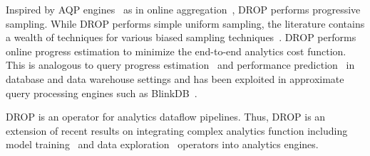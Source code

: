 Inspired by AQP engines~\cite{barzan-keynote}
as in online aggregation~\cite{onlineagg}, DROP performs progressive
sampling.  
While DROP performs simple uniform sampling, the literature contains a wealth of techniques for various biased sampling techniques~\cite{surajit-sample, surajit-2}.
DROP performs online progress estimation to minimize the
end-to-end analytics cost function. This is analogous to query
progress estimation~\cite{qpi1} and performance
prediction~\cite{mr-predict} in database and data
warehouse settings and has been exploited in approximate query
processing engines such as BlinkDB~\cite{blinkdb}. 

 DROP is an operator
for analytics dataflow pipelines. Thus, DROP is
an extension of recent results on integrating complex
analytics function including model training~\cite{bismarck,mcdb} and
data exploration~\cite{scorpion,canopy,kraska-viz} operators into analytics engines. 
